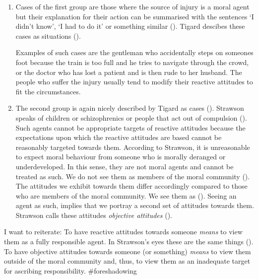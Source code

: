 \documentclass{article}
\begin{document}
\begin{enumerate}
	\item Cases of the first group are those where the source of injury is a
		moral agent but their explanation for their action can be
		summarised with the sentences `I didn't know', `I had to do it'
		or something similar (\cite[p.7-8]{Strawson1962}). Tigard
		descibes these cases as situations  
		(\cite[p.5]{Tigard_2020}).

		Examples of such cases are the gentleman who accidentally steps
		on someones foot because the train is too full and he tries to
		navigate through the crowd, or the doctor who has lost a patient
		and is then rude to her husband. The people who suffer the
		injury usually tend to modify their reactive attitudes to fit
		the circumstances.



	\item The second group is again nicely described by Tigard as cases
		 (\cite[p.5]{Tigard_2020}). Strawson speaks of children
		or schizophrenics or people that act out of compulsion
		(\cite[p.8-9]{Strawson1962}). Such
		agents cannot be appropriate targets of reactive attitudes
		because the expectations upon which the reactive attitudes are
		based cannot be reasonably targeted towards them. According to
		Strawson, it is unreasonable to expect moral behaviour from
		someone who is morally deranged or underdeveloped. In this
		sense, they are not moral agents and cannot be treated as such.
		We do not see them as members of the moral community
		(\cite[p.18]{Strawson1962}). The attitudes we exhibit towards
		them differ accordingly compared to those who are members of the
		moral community. We see them as 
		(\cite[p.8]{Strawson1962}). Seeing an agent as such, implies
		that we portray a second set of attitudes towards them. Strawson
		calls these attitudes \textit{objective attitudes}
		(\cite[p.9]{Strawson1962}). 
\end{enumerate}

I want to reiterate: To have reactive attitudes towards someone \textit{means}
to view them as a fully responsible agent. In Strawson's eyes these are the same
things (\cite[p.23]{Strawson1962}). To have objective attitudes towards someone (or something)
\textit{means} to view them outside of the moral community and, thus, to view
them as an inadequate target for ascribing responsibility. \#foreshadowing\\
\end{document}
